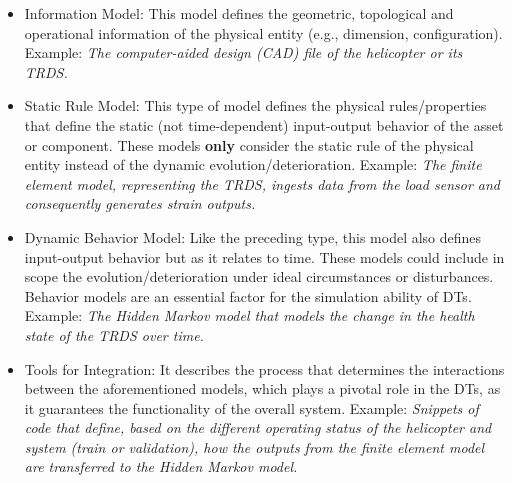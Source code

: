 \documentclass[runningheads]{llncs}
\begin{document}
\begin{itemize}
    \item Information Model: This model defines the geometric, topological and operational information of the physical entity (e.g., dimension, configuration). Example: \textit{The computer-aided design (CAD) file of the helicopter or its TRDS.}
    \item Static Rule Model: This type of model defines the physical rules/properties that define the static (not time-dependent) input-output behavior of the asset or component. These models \textbf{only} consider the static rule of the physical entity instead of the dynamic evolution/deterioration. Example:  \textit{The finite element model, representing the TRDS, ingests data from the load sensor and consequently generates strain outputs.}
    \item Dynamic Behavior Model: Like the preceding type, this model also defines input-output behavior but as it relates to time. These models could include in scope the evolution/deterioration under ideal circumstances or disturbances. Behavior models are an essential factor for the simulation ability of DTs. Example:  \textit{The Hidden Markov model that models the change in the health state of the TRDS over time.}
    \item Tools for Integration: It describes the process that determines the interactions between the aforementioned models, which plays a pivotal role in the DTs, as it guarantees the functionality of the overall system. Example:  \textit{Snippets of code that define, based on the different operating status of the helicopter and system (train or validation), how the outputs from the finite element model are transferred to the Hidden Markov model.}
\end{itemize}
\end{document}
